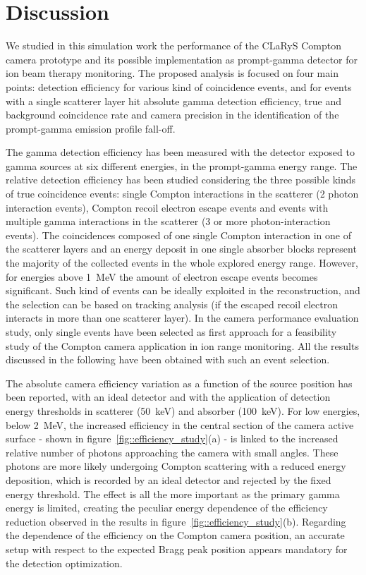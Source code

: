 \section{Discussion}

We studied in this simulation work the performance of the CLaRyS Compton camera prototype and its possible implementation as prompt-gamma detector for ion beam therapy monitoring. The proposed analysis is focused on four main points: detection efficiency for various kind of coincidence events, and for events with a single scatterer layer hit absolute gamma detection efficiency, true and background coincidence rate and camera precision in the identification of the prompt-gamma emission profile fall-off.

The gamma detection efficiency has been measured with the detector exposed to gamma sources at six different energies, in the prompt-gamma energy range. The relative detection efficiency has been studied considering the three possible kinds of true coincidence events: single Compton interactions in the scatterer (2 photon interaction events), Compton recoil electron escape events and events with multiple gamma interactions in the scatterer (3 or more photon-interaction events). The coincidences composed of one single Compton interaction in one of the scatterer layers and an energy deposit in one single absorber blocks represent the majority of the collected events in the whole explored energy range. However, for energies above 1~MeV the amount of electron escape events becomes significant. Such kind of events can be ideally exploited in the reconstruction, and the selection can be based on tracking analysis (if the escaped recoil electron interacts in more than one scatterer layer). In the camera performance evaluation study, only single events have been selected as first approach for a feasibility study of the Compton camera application in ion range monitoring. 
All the results discussed in the following have been obtained with such an event selection.

The absolute camera efficiency variation as a function of the source position has been reported, with an ideal detector and with the application of detection energy thresholds in scatterer (50~keV) and absorber (100~keV). 
For low energies, below 2~MeV, the increased efficiency in the central section of the camera active surface - shown in figure~\ref{fig::efficiency_study}(a) - is linked to the increased relative number of photons approaching the camera with small angles. These photons are more likely undergoing Compton scattering with a reduced energy deposition, which is recorded by an ideal detector and rejected by the fixed energy threshold. The effect is all the more important as the primary gamma energy is limited, creating the peculiar energy dependence of the efficiency reduction observed in the results in figure~\ref{fig::efficiency_study}(b).
Regarding the dependence of the efficiency on the Compton camera position, an accurate setup with respect to the expected Bragg peak position appears mandatory for the detection optimization.

